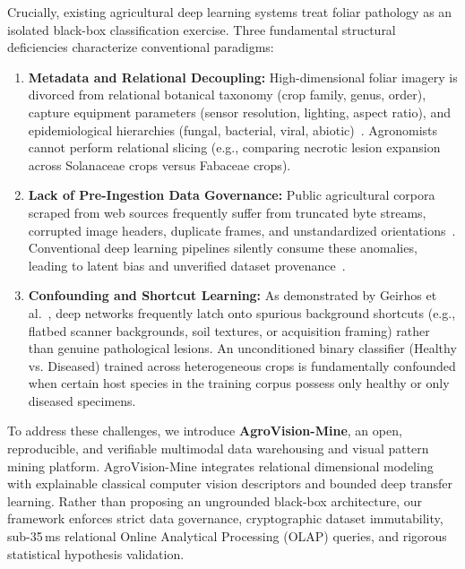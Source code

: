 \documentclass[conference,a4paper]{IEEEtran}
\begin{document}
Crucially, existing agricultural deep learning systems treat foliar pathology as an isolated black-box classification exercise. Three fundamental structural deficiencies characterize conventional paradigms:
\begin{enumerate}
    \item \textbf{Metadata and Relational Decoupling:} High-dimensional foliar imagery is divorced from relational botanical taxonomy (crop family, genus, order), capture equipment parameters (sensor resolution, lighting, aspect ratio), and epidemiological hierarchies (fungal, bacterial, viral, abiotic)~\cite{kimball2013datawarehouse}. Agronomists cannot perform relational slicing (e.g., comparing necrotic lesion expansion across Solanaceae crops versus Fabaceae crops).
    \item \textbf{Lack of Pre-Ingestion Data Governance:} Public agricultural corpora scraped from web sources frequently suffer from truncated byte streams, corrupted image headers, duplicate frames, and unstandardized orientations~\cite{singh2020plantdoc}. Conventional deep learning pipelines silently consume these anomalies, leading to latent bias and unverified dataset provenance~\cite{torralba2011unbiased}.
    \item \textbf{Confounding and Shortcut Learning:} As demonstrated by Geirhos et al.~\cite{geirhos2020shortcut}, deep networks frequently latch onto spurious background shortcuts (e.g., flatbed scanner backgrounds, soil textures, or acquisition framing) rather than genuine pathological lesions. An unconditioned binary classifier (Healthy vs. Diseased) trained across heterogeneous crops is fundamentally confounded when certain host species in the training corpus possess only healthy or only diseased specimens.
\end{enumerate}

To address these challenges, we introduce \textbf{AgroVision-Mine}, an open, reproducible, and verifiable multimodal data warehousing and visual pattern mining platform. AgroVision-Mine integrates relational dimensional modeling with explainable classical computer vision descriptors and bounded deep transfer learning. Rather than proposing an ungrounded black-box architecture, our framework enforces strict data governance, cryptographic dataset immutability, sub-35\,ms relational Online Analytical Processing (OLAP) queries, and rigorous statistical hypothesis validation.
\end{document}
